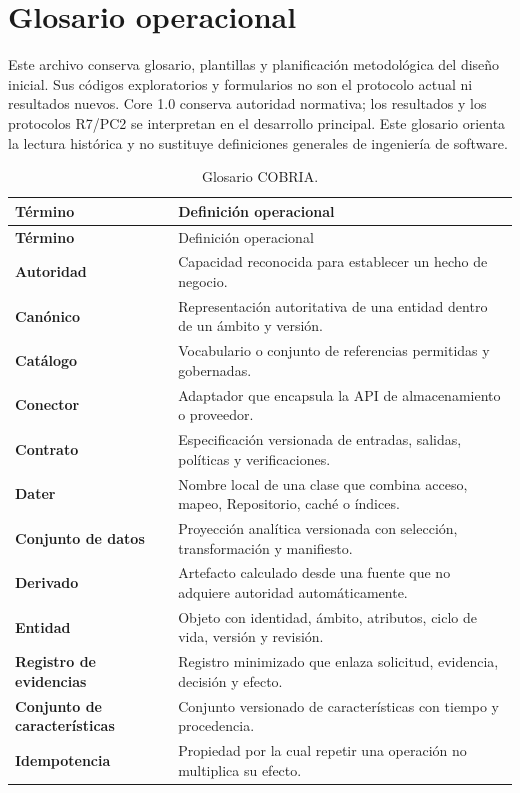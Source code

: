 \chapter{Glosario operacional}

Este archivo conserva glosario, plantillas y planificación metodológica del diseño
inicial. Sus códigos exploratorios y formularios no son el protocolo actual ni
resultados nuevos. Core 1.0 conserva autoridad normativa; los resultados y los
protocolos R7/PC2 se interpretan en el desarrollo principal. Este glosario orienta
la lectura histórica y no sustituye definiciones generales de ingeniería de software.

\begin{longtable}{>{\bfseries}p{3.6cm}p{10.6cm}}
\caption{Glosario COBRIA.}\label{tab:glosario-cobria}\\
\toprule
Término & Definición operacional \\
\midrule
\endfirsthead
\toprule
Término & Definición operacional \\
\midrule
\endhead
Autoridad & Capacidad reconocida para establecer un hecho de negocio.\\
Canónico & Representación autoritativa de una entidad dentro de un ámbito y versión.\\
Catálogo & Vocabulario o conjunto de referencias permitidas y gobernadas.\\
Conector & Adaptador que encapsula la API de almacenamiento o proveedor.\\
Contrato & Especificación versionada de entradas, salidas, políticas y verificaciones.\\
Dater & Nombre local de una clase que combina acceso, mapeo, Repositorio, caché o índices.\\
Conjunto de datos & Proyección analítica versionada con selección, transformación y manifiesto.\\
Derivado & Artefacto calculado desde una fuente que no adquiere autoridad automáticamente.\\
Entidad & Objeto con identidad, ámbito, atributos, ciclo de vida, versión y revisión.\\
Registro de evidencias & Registro minimizado que enlaza solicitud, evidencia, decisión y efecto.\\
Conjunto de características & Conjunto versionado de características con tiempo y procedencia.\\
Idempotencia & Propiedad por la cual repetir una operación no multiplica su efecto.\\

\end{longtable}
